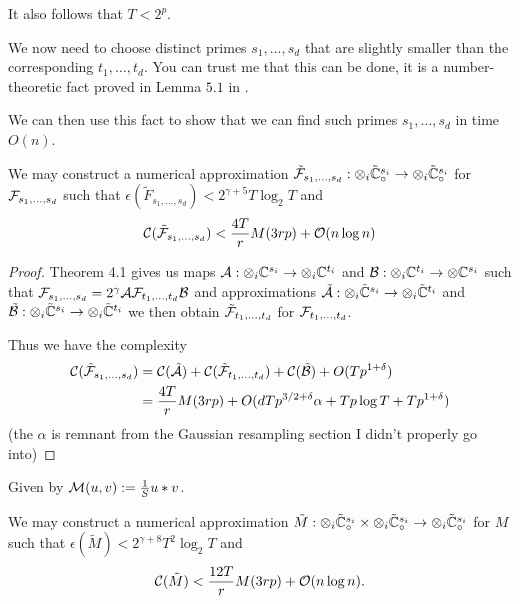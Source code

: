 It also follows that $T < 2^p$.

We now need to choose distinct primes $s_1, \ldots, s_d$ that are slightly smaller than the corresponding $t_1, \ldots, t_d$. You can trust me that this can be done, it is a number-theoretic fact proved in Lemma $5.1$ in \cite{nlogn}.

We can then use this fact to show that we can find such primes $s_1, \ldots, s_d$ in time $O(n)$.

\begin{proposition}
    We may construct a numerical approximation $\tilde{\mathcal F}_{s_1, \ldots, s_d}: \otimes_i \tilde{{\mathbb C}}_\circ^{s_i} \to \otimes_i \tilde{{\mathbb C}}_\circ^{s_i}$ for $\mathcal F_{s_1, \ldots, s_d}$ such that $\epsilon(\tilde{F}_{s_1, \ldots, s_d}) < 2^{\gamma + 5} T \log_2 T$ and
    \[
        \mathcal C(\tilde{\mathcal F}_{s_1, \ldots, s_d}) < \frac{4T}{r} M(3rp) + \mathcal O(n \log n)
    \]
\end{proposition}

\begin{proof}
    Theorem 4.1 gives us maps $\mathcal A: \otimes_i {\mathbb C}^{s_i} \to \otimes_i {\mathbb C}^{t_i}$ and $\mathcal B: \otimes_i {\mathbb C}^{t_i} \to \otimes {\mathbb C}^{s_i}$ such that $\mathcal F_{s_1, \ldots, s_d} = 2^\gamma \mathcal A\mathcal F_{t_1, \ldots, t_d} \mathcal B$ and approximations $\tilde{\mathcal A}: \otimes_i \tilde{{\mathbb C}}^{s_i} \to \otimes_i \tilde{{\mathbb C}}^{t_i}$ and $\tilde{\mathcal B}: \otimes_i \tilde{{\mathbb C}}^{s_i} \to \otimes_i \tilde{{\mathbb C}}^{t_i}$ we then obtain $\tilde{\mathcal F}_{t_1, \ldots, t_d}$ for $\mathcal F_{t_1, \ldots, t_d}$.

    Thus we have the complexity
    \begin{align*}
        \mathcal C(\tilde{\mathcal F}_{s_1, \ldots, s_d}) &= \mathcal C(\tilde{\mathcal A}) + \mathcal C(\tilde{\mathcal F}_{t_1, \ldots, t_d}) + \mathcal C(\tilde{\mathcal B}) + O(Tp^{1 + \delta})\\
                                                &= \frac{4T}{r}M(3rp) + O(dTp^{3/2 + \delta}\alpha + Tp\log T + Tp^{1 + \delta})
    \end{align*}
    (the $\alpha$ is remnant from the Gaussian resampling section I didn't properly go into)
\end{proof}

Given by $\mathcal M(u, v) := \frac{1}{S}u \ast v$.

\begin{proposition}
    We may construct a numerical approximation $\tilde{M}: \otimes_i \tilde{{\mathbb C}}_\circ^{s_i} \times \otimes_i \tilde{{\mathbb C}}_\circ^{s_i} \to \otimes_i \tilde{{\mathbb C}}_\circ^{s_i}$ for $M$ such that $\epsilon(\tilde{M}) < 2^{\gamma + 8}T^2 \log_2T$ and
    \[
        \mathcal C(\tilde{M}) < \frac{12T}{r} M(3rp) + \mathcal O(n \log n).
    \]
\end{proposition}

